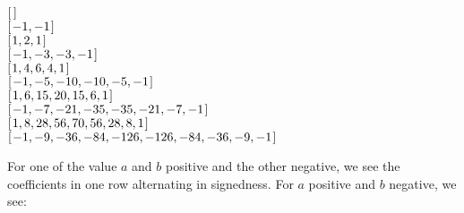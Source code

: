 \documentclass[tikz]{scrreprt}
\begin{document}
\begin{minipage}{\textwidth}
\ensuremath{[\mskip1.5mu \mskip1.5mu]}\\
\ensuremath{[\mskip1.5mu \mathbin{-}\mathrm{1},\mathbin{-}\mathrm{1}\mskip1.5mu]}\\
\ensuremath{[\mskip1.5mu \mathrm{1},\mathrm{2},\mathrm{1}\mskip1.5mu]}\\
\ensuremath{[\mskip1.5mu \mathbin{-}\mathrm{1},\mathbin{-}\mathrm{3},\mathbin{-}\mathrm{3},\mathbin{-}\mathrm{1}\mskip1.5mu]}\\
\ensuremath{[\mskip1.5mu \mathrm{1},\mathrm{4},\mathrm{6},\mathrm{4},\mathrm{1}\mskip1.5mu]}\\
\ensuremath{[\mskip1.5mu \mathbin{-}\mathrm{1},\mathbin{-}\mathrm{5},\mathbin{-}\mathrm{10},\mathbin{-}\mathrm{10},\mathbin{-}\mathrm{5},\mathbin{-}\mathrm{1}\mskip1.5mu]}\\
\ensuremath{[\mskip1.5mu \mathrm{1},\mathrm{6},\mathrm{15},\mathrm{20},\mathrm{15},\mathrm{6},\mathrm{1}\mskip1.5mu]}\\
\ensuremath{[\mskip1.5mu \mathbin{-}\mathrm{1},\mathbin{-}\mathrm{7},\mathbin{-}\mathrm{21},\mathbin{-}\mathrm{35},\mathbin{-}\mathrm{35},\mathbin{-}\mathrm{21},\mathbin{-}\mathrm{7},\mathbin{-}\mathrm{1}\mskip1.5mu]}\\
\ensuremath{[\mskip1.5mu \mathrm{1},\mathrm{8},\mathrm{28},\mathrm{56},\mathrm{70},\mathrm{56},\mathrm{28},\mathrm{8},\mathrm{1}\mskip1.5mu]}\\
\ensuremath{[\mskip1.5mu \mathbin{-}\mathrm{1},\mathbin{-}\mathrm{9},\mathbin{-}\mathrm{36},\mathbin{-}\mathrm{84},\mathbin{-}\mathrm{126},\mathbin{-}\mathrm{126},\mathbin{-}\mathrm{84},\mathbin{-}\mathrm{36},\mathbin{-}\mathrm{9},\mathbin{-}\mathrm{1}\mskip1.5mu]}
\end{minipage}

For one of the value $a$ and $b$ positive and
the other negative, we see the coefficients in one row
alternating in signedness.
For $a$ positive and $b$ negative, we see:
\end{document}

